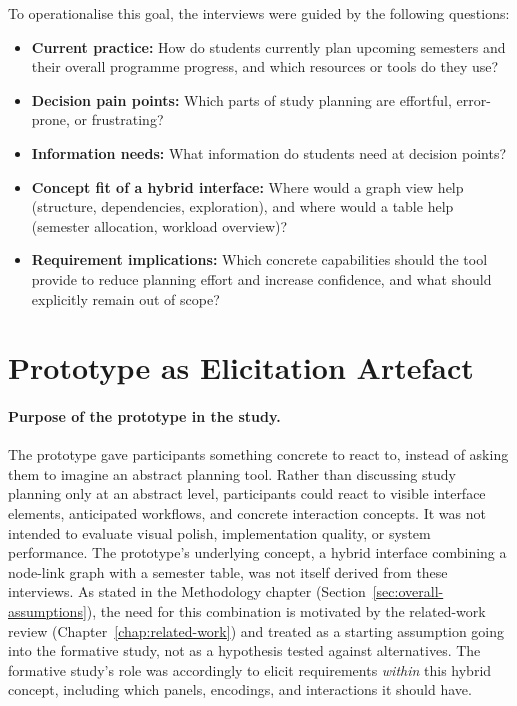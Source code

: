 To operationalise this goal, the interviews were guided by the following questions:

\begin{itemize}
    \item \textbf{Current practice:} How do students currently plan upcoming semesters and their overall programme progress, and which resources or tools do they use?
    \item \textbf{Decision pain points:} Which parts of study planning are effortful, error-prone, or frustrating?
    \item \textbf{Information needs:} What information do students need at decision points?
    \item \textbf{Concept fit of a hybrid interface:} Where would a graph view help (structure, dependencies, exploration), and where would a table help (semester allocation, workload overview)?
    \item \textbf{Requirement implications:} Which concrete capabilities should the tool provide to reduce planning effort and increase confidence, and what should explicitly remain out of scope?
\end{itemize}

\section{Prototype as Elicitation Artefact}
\label{sec:prototype-elicitation}

\paragraph{Purpose of the prototype in the study.}
The prototype gave participants something concrete to react to, instead of asking them to imagine an abstract planning tool. Rather than discussing study planning only at an abstract level, participants could react to visible interface elements, anticipated workflows, and concrete interaction concepts. It was not intended to evaluate visual polish, implementation quality, or system performance.
The prototype's underlying concept, a hybrid interface combining a node-link graph with a semester table, was not itself derived from these interviews. As stated in the Methodology chapter (Section~\ref{sec:overall-assumptions}), the need for this combination is motivated by the related-work review (Chapter~\ref{chap:related-work}) and treated as a starting assumption going into the formative study, not as a hypothesis tested against alternatives. The formative study's role was accordingly to elicit requirements \emph{within} this hybrid concept, including which panels, encodings, and interactions it should have.

